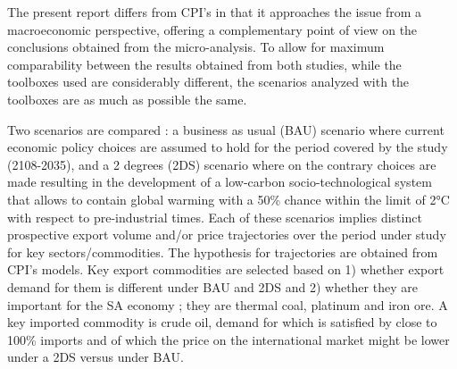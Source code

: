 \documentclass[12pt,english]{article}
\begin{document}
The present report differs from CPI's in that it approaches the issue from a macroeconomic perspective, %
offering a complementary point of view on the conclusions obtained from the micro-analysis. To allow for maximum comparability between the results obtained from both studies, while the toolboxes used are considerably different, the scenarios analyzed with the toolboxes are as much as possible the same. 

Two scenarios are compared : a business as usual (BAU) scenario where current economic policy choices are assumed to hold for the period covered by the study (2108-2035), %
and a 2 degrees (2DS) scenario where on the contrary choices are made resulting in the development of a low-carbon socio-technological system that allows to contain %
global warming with a 50\% chance within the limit of 2°C with respect to pre-industrial times. Each of these scenarios implies distinct prospective export volume and/or price trajectories over the period under study for key sectors/commodities. The hypothesis for trajectories are obtained from CPI's models. Key export commodities are selected based on 1) whether export demand for them is different under BAU and 2DS and 2) whether they are important for the SA economy ; they are thermal coal, platinum and iron ore. A key imported commodity is crude oil, demand for which is satisfied by close to 100\% imports and of which the price on the international market might be lower under a 2DS versus under BAU. 
\end{document}

